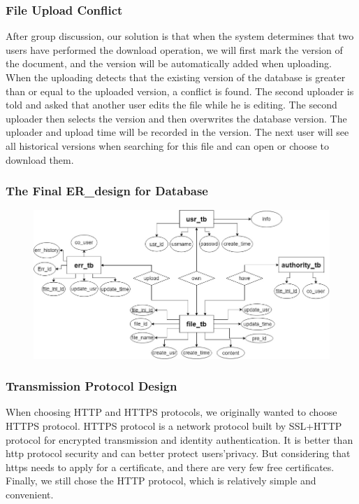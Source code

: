 \subsubsection{File Upload Conflict}
\noindent After group discussion, our solution is that when the system determines that two users have performed the download operation, we will first mark the version of the document, and the version will be automatically added when uploading. When the uploading detects that the existing version of the database is greater than or equal to the uploaded version, a conflict is found. The second uploader is told and asked that another user edits the file while he is editing. The second uploader then selects the version and then overwrites the database version. The uploader and upload time will be recorded in the version. The next user will see all historical versions when searching for this file and can open or choose to download them.


\subsubsection{The Final ER\_design for Database}
\begin{figure}[H]
  \centering
  \includegraphics[width=.8\textwidth]{designdb.png} %
  
  \label{png0} %
\end{figure}

\subsubsection{Transmission Protocol Design}
\noindent When choosing HTTP and HTTPS protocols, we originally wanted to choose HTTPS protocol. HTTPS protocol is a network protocol built by SSL+HTTP protocol for encrypted transmission and identity authentication. It is better than http protocol security and can better protect users’privacy. But considering that https needs to apply for a certificate, and there are very few free certificates. Finally, we still chose the HTTP protocol, which is relatively simple and convenient.

